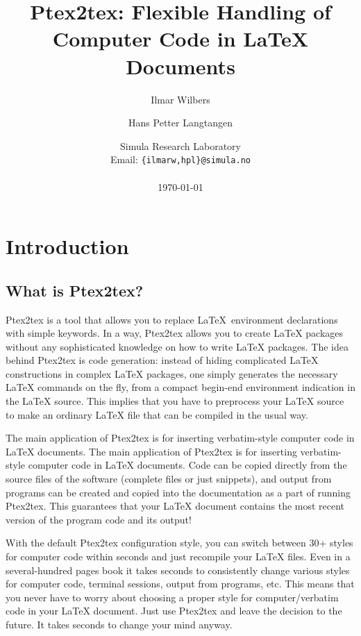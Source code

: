\documentclass[a4paper,11pt]{article}
\begin{document}
\title{Ptex2tex: Flexible Handling of Computer Code in \LaTeX{} Documents}
\author{Ilmar Wilbers \and Hans Petter Langtangen}

\date{Simula Research Laboratory\\ 
Email: \texttt{\{ilmarw,hpl\}@simula.no}\\
\ \ \\
\today}
\maketitle

\section{Introduction}
\subsection{What is Ptex2tex?}
Ptex2tex is a tool that allows you to replace \LaTeX~environment declarations
with simple keywords. In a way, Ptex2tex allows you to create \LaTeX{}
packages without any sophisticated knowledge on how to write
\LaTeX{} packages. The idea behind Ptex2tex is code generation: instead
of hiding complicated \LaTeX{} constructions in complex \LaTeX{}
packages, one simply generates the necessary \LaTeX{} commands on the
fly, from a compact begin-end environment indication in the \LaTeX{}
source.
This implies that you have to preprocess your \LaTeX{} source
to make an ordinary {\LaTeX} file that can be compiled in the usual way.

The main application of Ptex2tex is for inserting verbatim-style
computer code in \LaTeX{} documents.  The main application of Ptex2tex
is for inserting verbatim-style computer code in \LaTeX{}
documents. Code can be copied directly from the source files of the
software (complete files or just snippets), and output from programs
can be created and copied into the documentation as a part of running
Ptex2tex.  This guarantees that your {\LaTeX} document contains the most
recent version of the program code and its output!


With the default Ptex2tex
configuration style, you can switch between 30+ styles for computer
code within seconds and just recompile your \LaTeX{} files.
Even in a several-hundred pages book it takes seconds to consistently
change various styles for computer code, terminal sessions, output
from programs, etc. This means that you never have to worry about
choosing a proper style for computer/verbatim code in your \LaTeX{} document.
Just use Ptex2tex and leave the decision to the future. It takes
seconds to change your mind anyway.
\end{document}
